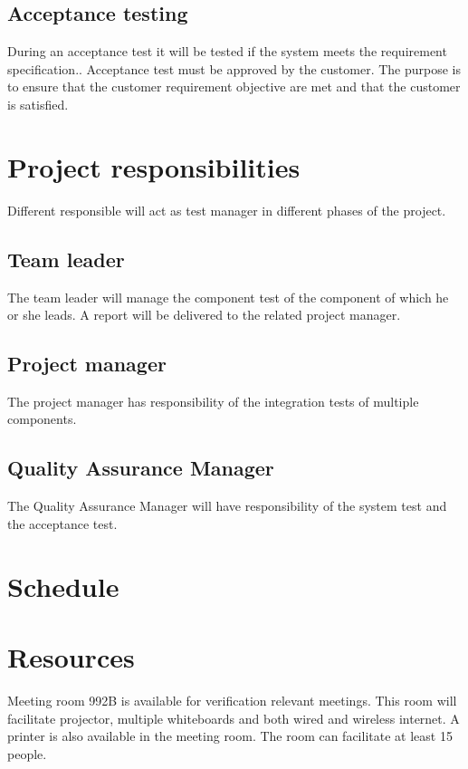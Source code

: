 \subsection{Acceptance testing}
During an acceptance test it will be tested if the system meets the requirement specification.. Acceptance test must be approved by the customer. The purpose is to ensure that the customer requirement objective are met and that the customer is satisfied.

\label{sec_projectresponsibilities}
\section{Project responsibilities}
Different responsible will act as test manager in different phases of the project.

\subsection{Team leader}
The team leader will manage the component test of the component of which he or she leads. A report will be delivered to the related project manager.

\subsection{Project manager}
The project manager has responsibility of the integration tests of multiple components.

\subsection{Quality Assurance Manager}
The Quality Assurance Manager will have responsibility of the system test and the acceptance test. 


\section{Schedule}


\section{Resources}
Meeting room 992B is available for verification relevant meetings. This room will facilitate projector, multiple whiteboards and both wired and wireless internet. A printer is also available in the meeting room. The room can facilitate at least 15 people.
 


